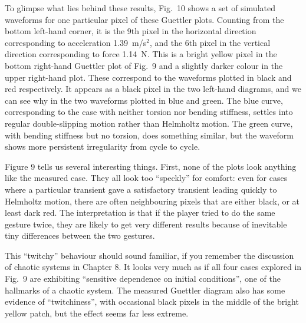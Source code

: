 



  To glimpse what lies behind these results, Fig.\ 10 shows a set of simulated 
  waveforms for one particular pixel of these Guettler plots. Counting from the 
  bottom left-hand corner, it is the 9th pixel in the horizontal direction 
  corresponding to acceleration 1.39~m/s$^2$, and the 6th pixel in the vertical 
  direction corresponding to force 1.14~N. This is a bright yellow pixel in the 
  bottom right-hand Guettler plot of Fig.\ 9 and a slightly darker colour in 
  the upper right-hand plot. These correspond to the waveforms plotted in black 
  and red respectively. It appears as a black pixel in the two left-hand 
  diagrams, and we can see why in the two waveforms plotted in blue and green. 
  The blue curve, corresponding to the case with neither torsion nor bending 
  stiffness, settles into regular double-slipping motion rather than Helmholtz 
  motion. The green curve, with bending stiffness but no torsion, does 
  something similar, but the waveform shows more persistent irregularity from 
  cycle to cycle. 


  Figure 9 tells us several interesting things. First, none of the plots look 
  anything like the measured case. They all look too “speckly” for comfort: 
  even for cases where a particular transient gave a satisfactory transient 
  leading quickly to Helmholtz motion, there are often neighbouring pixels that 
  are either black, or at least dark red. The interpretation is that if the 
  player tried to do the same gesture twice, they are likely to get very 
  different results because of inevitable tiny differences between the two 
  gestures. 

  This “twitchy” behaviour should sound familiar, if you remember the 
  discussion of chaotic systems in Chapter 8. It looks very much as if all four 
  cases explored in Fig.\ 9 are exhibiting “sensitive dependence on initial 
  conditions”, one of the hallmarks of a chaotic system. The measured Guettler 
  diagram also has some evidence of “twitchiness”, with occasional black pixels 
  in the middle of the bright yellow patch, but the effect seems far less 
  extreme. 

